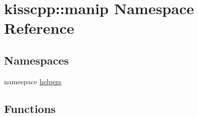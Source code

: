 \hypertarget{namespacekisscpp_1_1manip}{\section{kisscpp\-:\-:manip Namespace Reference}
\label{namespacekisscpp_1_1manip}
}
\subsection*{Namespaces}
\begin{DoxyCompactItemize}
\item 
namespace \hyperlink{namespacekisscpp_1_1manip_1_1helpers}{helpers}
\end{DoxyCompactItemize}
\subsection*{Functions}
